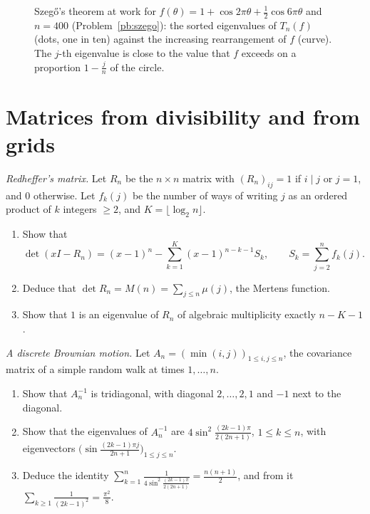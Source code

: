\begin{figure}[ht]
\centering
{}
\caption{Szegő's theorem at work for $f(\theta)=1+\cos2\pi\theta+\frac12\cos6\pi\theta$ and $n=400$ (Problem~\ref{pb:szego}): the sorted eigenvalues of $T_n(f)$ (dots, one in ten)
against the increasing rearrangement of $f$ (curve). The $j$-th eigenvalue is close to the value that $f$ exceeds on a proportion $1-\frac jn$ of the circle.}\label{fig:szego}
\end{figure}

\section{Matrices from divisibility and from grids}

\begin{exercise}[$\star\star$]\label{pb:redheffer}
\emph{Redheffer's matrix.} Let $R_n$ be the $n\times n$ matrix with $(R_n)_{ij}=1$ if $i\mid j$ or $j=1$, and $0$ otherwise. Let $f_k(j)$ be the number of ways of writing $j$ as an
ordered product of $k$ integers $\ge2$, and $K=\lfloor\log_2n\rfloor$.
\begin{enumerate}[label=(\alph*)]
\item Show that
\[
\det(xI-R_n)=(x-1)^n-\sum_{k=1}^K(x-1)^{n-k-1}S_k,\qquad S_k=\sum_{j=2}^nf_k(j).
\]
\item Deduce that $\det R_n=M(n)=\sum_{j\le n}\mu(j)$, the Mertens function.
\item Show that $1$ is an eigenvalue of $R_n$ of algebraic multiplicity exactly $n-K-1$.
\end{enumerate}
\end{exercise}

\begin{exercise}[$\star$]\label{pb:minmatrix}
\emph{A discrete Brownian motion.} Let $A_n=(\min(i,j))_{1\le i,j\le n}$, the covariance matrix of a simple random walk at times $1,\dots,n$.
\begin{enumerate}[label=(\alph*)]
\item Show that $A_n^{-1}$ is tridiagonal, with diagonal $2,\dots,2,1$ and $-1$ next to the diagonal.
\item Show that the eigenvalues of $A_n^{-1}$ are $4\sin^2\frac{(2k-1)\pi}{2(2n+1)}$, $1\le k\le n$, with eigenvectors $\bigl(\sin\frac{(2k-1)\pi j}{2n+1}\bigr)_{1\le j\le n}$.
\item Deduce the identity $\sum_{k=1}^n\frac1{4\sin^2\frac{(2k-1)\pi}{2(2n+1)}}=\frac{n(n+1)}2$, and from it $\sum_{k\ge1}\frac1{(2k-1)^2}=\frac{\pi^2}8$.
\end{enumerate}
\end{exercise}

